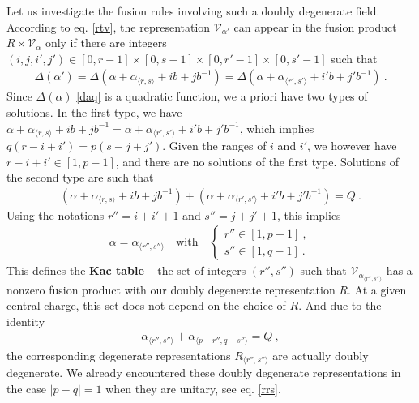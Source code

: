 \documentclass[12pt,a4paper,notitlepage]{report}
\numberwithin{equation}{section}
\theoremstyle{break}
\begin{document}
Let us investigate the fusion rules involving such a doubly degenerate field.
According to eq. \eqref{rtv}, the representation $\mathcal{V}_{\alpha'} $ can appear in the fusion product $R\times \mathcal{V}_\alpha$ only if there are integers $(i,j,i',j')\in [0,r-1]\times [0,s-1]\times [0,r'-1]\times [0,s'-1]$ such that 
\begin{align}
 \Delta(\alpha') = \Delta\left(\alpha+\alpha_{\langle r,s \rangle} + ib+jb^{-1}\right) = \Delta\left(\alpha+\alpha_{\langle r',s' \rangle} +i'b+j'b^{-1}\right) \ .
\end{align}
Since $\Delta(\alpha)$ \eqref{daq} is a quadratic function, we a priori have two types of solutions.
In the first type, we have $\alpha+\alpha_{\langle r,s \rangle} + ib+jb^{-1} = \alpha+\alpha_{\langle r',s' \rangle} +i'b+j'b^{-1}$, which implies $q(r-i+i')=p(s-j+j')$.
Given the ranges of $i$ and $i'$, we however have $r-i+i'\in [1,p-1]$, and there are no solutions of the first type.
Solutions of the second type are such that 
\begin{align}
 \left(\alpha+\alpha_{\langle r,s \rangle} + ib+jb^{-1}\right) + \left(\alpha+\alpha_{\langle r',s' \rangle} +i'b+j'b^{-1}\right) = Q\ .
\end{align}
Using the notations $r'' = i+i'+1$ and $s''=j+j'+1$, this implies
\begin{align}
 \alpha=\alpha_{\langle r'',s'' \rangle}\quad \text{with}\quad  \left\{\begin{array}{l}  r'' \in [1,p-1]\ , \\ s'' \in [1,q-1]\ . \end{array}\right. 
\label{rpsq}
\end{align}
This defines the \textbf{\boldmath Kac table} -- the set of integers $(r'',s'')$ such that $\mathcal{V}_{\alpha_{\langle r'',s''\rangle}}$ has a nonzero fusion product with our doubly degenerate representation $R$.
At a given central charge, this set does not depend on the choice of $R$. 
And due to the identity 
\begin{align}
 \alpha_{\langle r'',s'' \rangle}+\alpha_{\langle p-r'',q-s'' \rangle}=Q\ ,
\end{align}
the corresponding degenerate representations $R_{\langle r'', s'' \rangle}$ are actually doubly degenerate. 
We already encountered these doubly degenerate representations in the case $|p-q|=1$ when they are unitary, see eq. \eqref{rrs}. 
\end{document}
